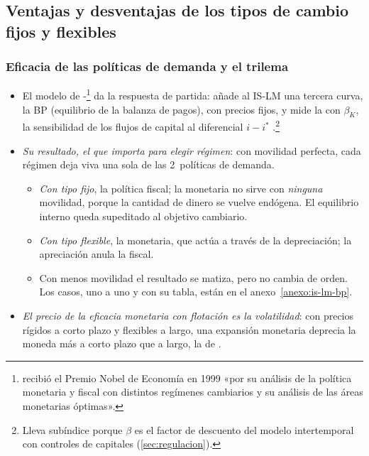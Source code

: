 \documentclass[11pt]{article}
\begin{document}
\subsection{Ventajas y desventajas de los tipos de cambio fijos y flexibles}\label{sec:ventajas}

\subsubsection{Eficacia de las políticas de demanda y el trilema}\label{sec:politicas-trilema}

\begin{itemize}
\item El modelo de -\footnote{ recibió el Premio Nobel de Economía en 1999 «por su análisis de la política monetaria y fiscal con distintos regímenes cambiarios y su análisis de las áreas monetarias óptimas»\nocite{Nobel1999Mundell}.} da la respuesta de partida: añade al IS-LM una tercera curva, la BP (equilibrio de la balanza de pagos), con precios fijos, y mide la  con $\beta_K$, la sensibilidad de los flujos de capital al diferencial $i-i^*$\nocite{Fleming1962Domestic,Mundell1963Capital} .\footnote{Lleva subíndice porque $\beta$ es el factor de descuento del modelo intertemporal con controles de capitales (\ref{sec:regulacion}).}
\item \emph{Su resultado, el que importa para elegir régimen}: con movilidad perfecta, cada régimen deja viva una sola de las 2~políticas de demanda.
  \begin{itemize}
  \item \emph{Con tipo fijo}, la política fiscal; la monetaria no sirve con \emph{ninguna} movilidad, porque la cantidad de dinero se vuelve endógena. El equilibrio interno queda supeditado al objetivo cambiario.
  \item \emph{Con tipo flexible}, la monetaria, que actúa a través de la depreciación; la apreciación anula la fiscal.
  \item Con menos movilidad el resultado se matiza, pero no cambia de orden. Los casos, uno a uno y con su tabla, están en el anexo~\ref{anexo:is-lm-bp}.
  \end{itemize}
\item \emph{El precio de la eficacia monetaria con flotación es la volatilidad}: con precios rígidos a corto plazo y flexibles a largo, una expansión monetaria deprecia la moneda más a corto plazo que a largo, la  de \textcite{Dornbusch1976Expectations} .

\end{itemize}
\end{document}
